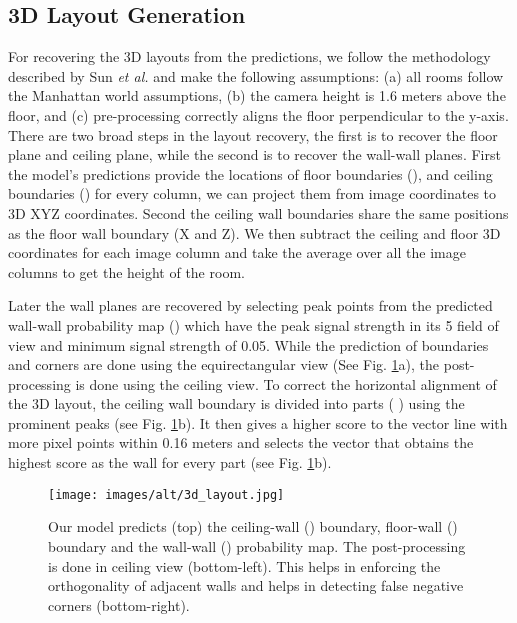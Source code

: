 \documentclass[final]{cvpr}
\begin{document}
\subsection{3D Layout Generation}\label{subsec:3D}
For recovering the 3D layouts from the predictions, we follow the methodology described by Sun \textit{et al.} \cite{sun2019horizonnet} and make the following assumptions: (a) all rooms follow the Manhattan world assumptions, (b) the camera height is 1.6 meters \cite{zhang2014panocontext} above the floor, and (c) pre-processing \cite{zou2018layoutnet} correctly aligns the floor perpendicular to the y-axis. There are two broad steps in the layout recovery, the first is to recover the floor plane and ceiling plane, while the second is to recover the wall-wall planes. First the model's predictions provide the locations of floor boundaries (), and ceiling boundaries () for every column, we can project them from image coordinates to 3D XYZ coordinates. Second the ceiling wall boundaries share the same positions as the floor wall boundary (X and Z). We then subtract the ceiling and floor 3D coordinates for each image column and take the average over all the image columns to get the height  of the room.


Later the wall planes are recovered by selecting peak points from the predicted wall-wall probability map () which have the peak signal strength in its 5 field of view and minimum signal strength of 0.05. While the prediction of boundaries and corners are done using the equirectangular view (See Fig. \ref{fig:3d_layout}a), the post-processing is done using the ceiling view. To correct the horizontal alignment of the 3D layout, the ceiling wall boundary is divided into parts (  ) using the prominent peaks (see Fig. \ref{fig:3d_layout}b). It then gives a higher score to the vector line with more pixel points within 0.16 meters and selects the vector that obtains the highest score as the wall for every part  (see Fig. \ref{fig:3d_layout}b). 



\begin{figure}[!t]
    \centering
    \texttt{[image: images/alt/3d\_layout.jpg]}
    \caption{Our model predicts (top) the ceiling-wall () boundary, floor-wall () boundary and the wall-wall () probability map. The post-processing is done in ceiling view (bottom-left). This helps in enforcing the orthogonality of adjacent walls and helps in detecting false negative corners (bottom-right).}
    \label{fig:3d_layout}
\end{figure}
\end{document}
